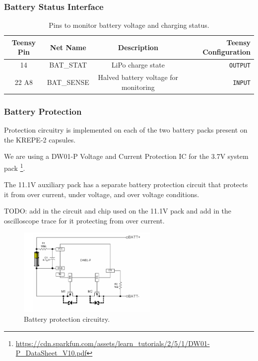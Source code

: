 \documentclass{article}
\begin{document}
\subsubsection{Battery Status Interface}
\begin{table}[H]
    \centering
    \caption{Pins to monitor battery voltage and charging status.}
	\label{tab:pins-battery}
    \begin{tabular}{c|c|c|r}
    Teensy Pin & Net Name  & Description   & Teensy Configuration \\
    \hline 
    14 & BAT\_STAT & LiPo charge state & \texttt{OUTPUT} \\
    22 A8 & BAT\_SENSE    &  Halved battery voltage for monitoring &   \texttt{INPUT} 
    \end{tabular}
\end{table}

\subsubsection{Battery Protection}
Protection circuitry is implemented on each of the two battery packs present on the KREPE-2 capsules. 

 We are using a DW01-P Voltage and Current Protection IC for the 3.7V system pack  \footnote{\url{https://cdn.sparkfun.com/assets/learn_tutorials/2/5/1/DW01-P_DataSheet_V10.pdf}}.

The 11.1V auxiliary pack has a separate battery protection circuit that protects it from over current, under voltage, and over voltage conditions.

TODO: add in the circuit and chip used on the 11.1V pack and add in the oscilloscope trace for it protecting from over current. 

\begin{figure}[H]
	\centering
	\includegraphics[width=0.6\textwidth]{images/dw108.png}
	\caption{Battery protection circuitry.}
	\label{fig:bat-protec}
\end{figure}
\end{document}
